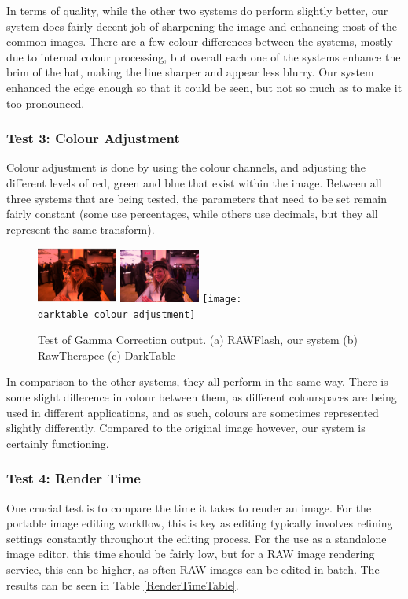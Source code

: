 \documentclass[10pt,a4paper]{article}
\begin{document}
In terms of quality, while the other two systems do perform slightly better, our system does fairly decent job of sharpening
the image and enhancing most of the common images. There are a few colour differences between the systems, mostly due to internal
colour processing, but overall each one of the systems enhance the brim of the hat, making the line sharper and appear less blurry. 
Our system enhanced the edge enough so that it could be seen, but not so much as to make it too pronounced.

\subsubsection{Test 3: Colour Adjustment}
Colour adjustment is done by using the colour channels, and adjusting the different levels of red, green and blue that exist within the image.
Between all three systems that are being tested, the parameters that need to be set remain fairly constant (some use percentages, while others use decimals,
but they all represent the same transform).

\begin{figure}
    \centering
    \subfigure
    {
        \includegraphics[width=100px]{rawflash_colour_adjustment}
    }
    \subfigure
    {
        \includegraphics[width=100px]{rawtherapee_colour_adjustment}
    }
    \subfigure
    {
        \texttt{[image: darktable\_colour\_adjustment]}
    }
    \caption{
        Test of Gamma Correction output. 
        (a) RAWFlash, our system
        (b) RawTherapee
        (c) DarkTable
    }
    \label{colouradjustmentcomparison}
 \end{figure}
In comparison to the other systems, they all perform in the same way. There is some slight difference in colour between them, as different colourspaces
are being used in different applications, and as such, colours are sometimes represented slightly differently. Compared to the original image however, our
system is certainly functioning.

\subsubsection{Test 4: Render Time}
One crucial test is to compare the time it takes to render an image. For the portable image editing workflow, this is key as editing typically involves
refining settings constantly throughout the editing process. For the use as a standalone image editor, this time should be fairly low, but for a RAW
image rendering service, this can be higher, as often RAW images can be edited in batch. The results can be seen in Table \ref{RenderTimeTable}.
\end{document}
